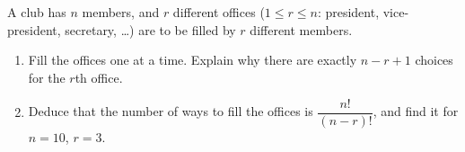 A club has $n$ members, and $r$ different offices ($1\le r\le n$: president, vice-president, secretary, \dots) are to be filled by $r$ different members.
\begin{enumerate}
\item[(a)] Fill the offices one at a time. Explain why there are exactly $n-r+1$ choices for the $r$th office.
\item[(b)] Deduce that the number of ways to fill the offices is $\dfrac{n!}{(n-r)!}$, and find it for $n=10$, $r=3$.
\end{enumerate}

